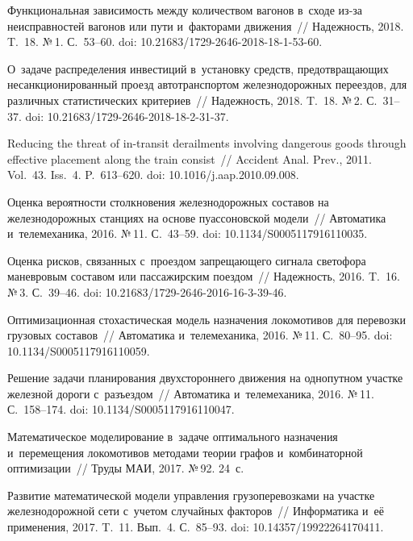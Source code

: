 \begin{multicols}{2}
{{\begin{thebibliography}{99}
Функциональная зависимость между количеством вагонов в~сходе из-за 
неисправностей вагонов или пути и~факторами движения~// 
Надежность, 2018. T.~18. №\,1. С.~53--60. 
doi: 10.21683/1729-2646-2018-18-1-53-60.

 О~задаче распределения инвестиций 
в~установку средств, предотвращающих несанкционированный проезд 
автотранспортом железнодорожных переездов, для различных статистических 
критериев~// Надежность, 2018. T.~18. №\,2. С.~31--37. 
doi: 10.21683/1729-2646-2018-18-2-31-37.

 Reducing the threat 
of in-transit derailments involving dangerous goods through effective 
placement along the train consist~// Accident Anal. Prev., 2011. 
Vol.~43. Iss.~4. P.~613--620. doi: 10.1016/j.aap.2010.09.008.

 Оценка вероятности 
столкновения железнодорожных составов на железнодорожных станциях на 
основе пуассоновской модели~// Автоматика и~телемеханика, 2016. №\,11. С.~43--59. 
doi: 10.1134/S0005117916110035.

 Оценка рисков, связанных с~проездом 
запрещающего сигнала светофора маневровым составом или пассажирским 
поездом~// Надежность, 2016. T.~16. №\,3. С.~39--46. 
doi: 10.21683/1729-2646-2016-16-3-39-46.

 Оптимизационная 
стохастическая модель назначения локомотивов для перевозки грузовых составов~// 
Автоматика и~телемеханика, 2016. №\,11. С.~80--95. 
doi: 10.1134/S0005117916110059.

 Решение задачи планирования 
двухстороннего движения на однопутном участке железной дороги с~разъездом~// 
Автоматика и~телемеханика, 2016. №\,11. С.~158--174. 
doi: 10.1134/S0005117916110047.

 Математическое моделирование в~задаче 
оптимального назначения и~перемещения локомотивов методами теории графов 
и~комбинаторной оптимизации~// Труды МАИ, 2017. №\,92. 24~с.

 Развитие 
математической модели управления грузоперевозками на участке железнодорожной 
сети с~учетом случайных факторов~// Информатика и~её применения, 2017. T.~11. 
Вып.~4. С.~85--93. doi: 10.14357/19922264170411.


\end{thebibliography}}}
\end{multicols}
